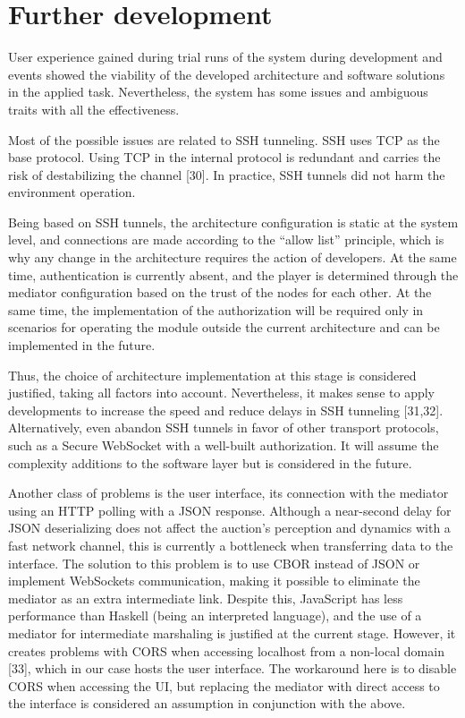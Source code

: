 \documentclass[
]{ceurart}
\begin{document}
\section{Further development}
\label{sec:further}

User experience gained during trial runs of the system during development and events showed the viability of the developed architecture and software solutions in the applied task. Nevertheless, the system has some issues and ambiguous traits with all the effectiveness.

Most of the possible issues are related to SSH tunneling. SSH uses TCP as the base protocol. Using TCP in the internal protocol is redundant and carries the risk of destabilizing the channel [30]. In practice, SSH tunnels did not harm the environment operation.

Being based on SSH tunnels, the architecture configuration is static at the system level, and connections are made according to the “allow list” principle, which is why any change in the architecture requires the action of developers. At the same time, authentication is currently absent, and the player is determined through the mediator configuration based on the trust of the nodes for each other. At the same time, the implementation of the authorization will be required only in scenarios for operating the module outside the current architecture and can be implemented in the future.

Thus, the choice of architecture implementation at this stage is considered justified, taking all factors into account. Nevertheless, it makes sense to apply developments to increase the speed and reduce delays in SSH tunneling [31,32]. Alternatively, even abandon SSH tunnels in favor of other transport protocols, such as a Secure WebSocket with a well-built authorization. It will assume the complexity additions to the software layer but is considered in the future.

Another class of problems is the user interface, its connection with the mediator using an HTTP polling with a JSON response. Although a near-second delay for JSON deserializing does not affect the auction’s perception and dynamics with a fast network channel, this is currently a bottleneck when transferring data to the interface. The solution to this problem is to use CBOR instead of JSON or implement WebSockets communication, making it possible to eliminate the mediator as an extra intermediate link. Despite this, JavaScript has less performance than Haskell (being an interpreted language), and the use of a mediator for intermediate marshaling is justified at the current stage. However, it creates problems with CORS when accessing localhost from a non-local domain [33], which in our case hosts the user interface. The workaround here is to disable CORS when accessing the UI, but replacing the mediator with direct access to the interface is considered an assumption in conjunction with the above.
\end{document}
